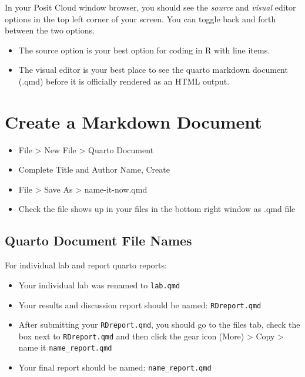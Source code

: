 \documentclass[
  english,
  letterpaper,
  DIV=11,
  numbers=noendperiod]{scrreprt}
\providecommand{\tightlist}{%
  \setlength{\itemsep}{0pt}\setlength{\parskip}{0pt}}
\begin{document}
In your Posit Cloud window browser, you should see the \emph{source} and
\emph{visual} editor options in the top left corner of your screen. You
can toggle back and forth between the two options.

\begin{itemize}
\item
  The source option is your best option for coding in R with line items.
\item
  The visual editor is your best place to see the quarto markdown
  document (.qmd) before it is officially rendered as an HTML output.
\end{itemize}

\chapter{Create a Markdown Document}\label{create-a-markdown-document}

\begin{itemize}
\tightlist
\item
  File \textgreater{} New File \textgreater{} Quarto Document
\item
  Complete Title and Author Name, Create
\item
  File \textgreater{} Save As \textgreater{} name-it-now.qmd
\item
  Check the file shows up in your files in the bottom right window as
  .qmd file
\end{itemize}

\section{Quarto Document File Names}\label{quarto-document-file-names}

For individual lab and report quarto reports:

\begin{itemize}
\tightlist
\item
  Your individual lab was renamed to \texttt{lab.qmd}
\item
  Your results and discussion report should be named:
  \texttt{RDreport.qmd}
\item
  After submitting your \texttt{RDreport.qmd}, you should go to the
  files tab, check the box next to \texttt{RDreport.qmd} and then click
  the gear icon (More) \textgreater{} Copy \textgreater{} name it
  \texttt{name\_report.qmd}
\item
  Your final report should be named: \texttt{name\_report.qmd}
\end{itemize}
\end{document}
